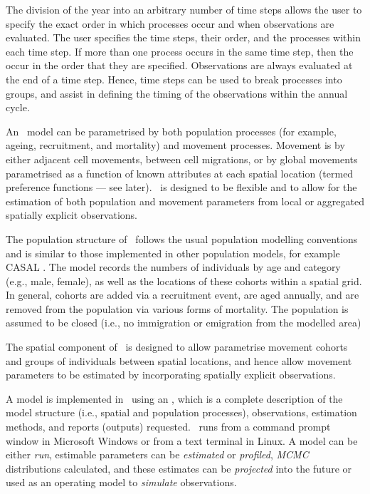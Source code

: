 The division of the year into an arbitrary number of time steps allows the user to specify the exact order in which processes occur and when observations are evaluated. The user specifies the time steps, their order, and the processes within each time step. If more than one process occurs in the same time step, then the occur in the order that they are specified. Observations are always evaluated at the end of a time step. Hence, time steps can be used to break processes into groups, and assist in defining the timing of the observations within the annual cycle. 

An \SPM\ model can be parametrised by both population processes (for example, ageing, recruitment, and mortality) and movement processes. Movement is by either adjacent cell movements, between cell migrations, or by global movements parametrised as a function of known attributes at each spatial location (termed preference functions --- see later). \SPM\ is designed to be flexible and to allow for the estimation of both population and movement parameters from local or aggregated spatially explicit observations. 

The population structure of \SPM\ follows the usual population modelling conventions and is similar to those implemented in other population models, for example CASAL \citep{1388}. The model records the numbers of individuals by age and category (e.g., male, female), as well as the locations of these cohorts within a spatial grid. In general, cohorts are added via a recruitment event, are aged annually, and are removed from the population via various forms of mortality. The population is assumed to be closed (i.e., no immigration or emigration from the modelled area)

The spatial component of \SPM\ is designed to allow parametrise movement cohorts and groups of individuals between spatial locations, and hence allow movement parameters to be estimated by incorporating spatially explicit observations. 

A model is implemented in \SPM\ using an \config {}, which is a complete description of the model structure (i.e., spatial and population processes), observations, estimation methods, and reports (outputs) requested. \SPM\ runs from a command prompt window in Microsoft Windows or from a text terminal in Linux. A model can be either \emph{run}, estimable parameters can be \emph{estimated} or \emph{profiled}, \emph{MCMC} distributions calculated, and these estimates can be \emph{projected} into the future or used as an operating model to \emph{simulate} observations.


